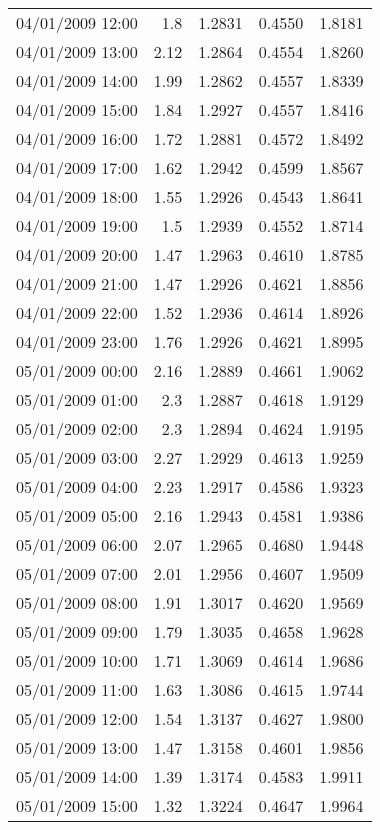 \begin{longtable}{|l|r|r|r|r|}
04/01/2009 12:00 & 1.8 & 1.2831 & 0.4550 & 1.8181 \\
04/01/2009 13:00 & 2.12 & 1.2864 & 0.4554 & 1.8260 \\
04/01/2009 14:00 & 1.99 & 1.2862 & 0.4557 & 1.8339 \\
04/01/2009 15:00 & 1.84 & 1.2927 & 0.4557 & 1.8416 \\
04/01/2009 16:00 & 1.72 & 1.2881 & 0.4572 & 1.8492 \\
04/01/2009 17:00 & 1.62 & 1.2942 & 0.4599 & 1.8567 \\
04/01/2009 18:00 & 1.55 & 1.2926 & 0.4543 & 1.8641 \\
04/01/2009 19:00 & 1.5 & 1.2939 & 0.4552 & 1.8714 \\
04/01/2009 20:00 & 1.47 & 1.2963 & 0.4610 & 1.8785 \\
04/01/2009 21:00 & 1.47 & 1.2926 & 0.4621 & 1.8856 \\
04/01/2009 22:00 & 1.52 & 1.2936 & 0.4614 & 1.8926 \\
04/01/2009 23:00 & 1.76 & 1.2926 & 0.4621 & 1.8995 \\
05/01/2009 00:00 & 2.16 & 1.2889 & 0.4661 & 1.9062 \\
05/01/2009 01:00 & 2.3 & 1.2887 & 0.4618 & 1.9129 \\
05/01/2009 02:00 & 2.3 & 1.2894 & 0.4624 & 1.9195 \\
05/01/2009 03:00 & 2.27 & 1.2929 & 0.4613 & 1.9259 \\
05/01/2009 04:00 & 2.23 & 1.2917 & 0.4586 & 1.9323 \\
05/01/2009 05:00 & 2.16 & 1.2943 & 0.4581 & 1.9386 \\
05/01/2009 06:00 & 2.07 & 1.2965 & 0.4680 & 1.9448 \\
05/01/2009 07:00 & 2.01 & 1.2956 & 0.4607 & 1.9509 \\
05/01/2009 08:00 & 1.91 & 1.3017 & 0.4620 & 1.9569 \\
05/01/2009 09:00 & 1.79 & 1.3035 & 0.4658 & 1.9628 \\
05/01/2009 10:00 & 1.71 & 1.3069 & 0.4614 & 1.9686 \\
05/01/2009 11:00 & 1.63 & 1.3086 & 0.4615 & 1.9744 \\
05/01/2009 12:00 & 1.54 & 1.3137 & 0.4627 & 1.9800 \\
05/01/2009 13:00 & 1.47 & 1.3158 & 0.4601 & 1.9856 \\
05/01/2009 14:00 & 1.39 & 1.3174 & 0.4583 & 1.9911 \\
05/01/2009 15:00 & 1.32 & 1.3224 & 0.4647 & 1.9964 \\

\end{longtable}
